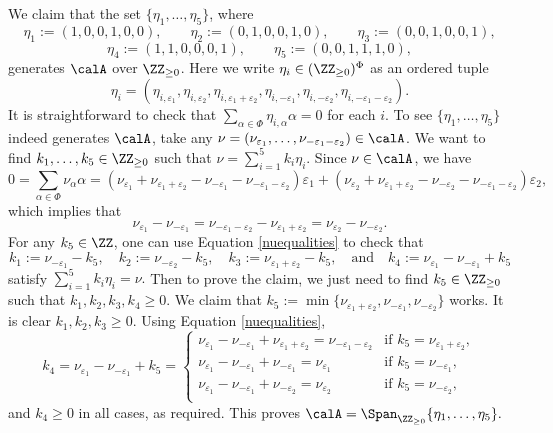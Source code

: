 \documentclass[12pt]{amsart}
\theoremstyle{plain}
\begin{document}
We claim that the set $\{\eta_1, \ldots, \eta_5\}$, where
$$\eta_1:=(1,0,0,1,0,0), \qquad \eta_2 := (0,1,0,0,1,0), \qquad \eta_3 := (0,0,1,0,0,1),$$
$$\eta_4 :=(1,1,0,0,0,1), \qquad \eta_5:=(0,0,1,1,1,0),$$
generates $\calA$ over $\ZZ_{\ge 0}$.
Here we write $\eta_i \in (\ZZ_{\ge 0})^\Phi$ as an ordered tuple 
$$\eta_i = (\eta_{i,\varepsilon_1}, \eta_{i,\varepsilon_2}, \eta_{i,\varepsilon_1+\varepsilon_2}, \eta_{i,-\varepsilon_1}, \eta_{i,-\varepsilon_2}, \eta_{i,-\varepsilon_1-\varepsilon_2}).$$
It is straightforward to check that $\sum_{\alpha\in\Phi} \eta_{i,\alpha}\alpha=0$ for each $i$.
To see $\{\eta_1, \ldots, \eta_5\}$ indeed generates $\calA$, take any $\nu = (\nu_{\varepsilon_1}, \ldots, \nu_{-\varepsilon_1-\varepsilon_2}) \in \calA$.
We want to find $k_1, \ldots, k_5 \in \ZZ_{\ge 0}$ such that $\nu = \sum_{i=1}^5 k_i \eta_i$.
Since $\nu \in \calA$, we have
$$0 = \sum_{\alpha \in \Phi} \nu_\alpha \alpha 
= (\nu_{\varepsilon_1}+\nu_{\varepsilon_1+\varepsilon_2}-\nu_{-\varepsilon_1}-\nu_{-\varepsilon_1-\varepsilon_2})\varepsilon_1 + (\nu_{\varepsilon_2} + \nu_{\varepsilon_1+\varepsilon_2}-\nu_{-\varepsilon_2}-\nu_{-\varepsilon_1-\varepsilon_2})\varepsilon_2,$$
which implies that
\begin{equation}\label{nuequalities}
	\nu_{\varepsilon_1} - \nu_{-\varepsilon_1} = \nu_{-\varepsilon_1-\varepsilon_2}-\nu_{\varepsilon_1+\varepsilon_2} = \nu_{\varepsilon_2} - \nu_{-\varepsilon_2}.
\end{equation}
For any $k_5 \in \ZZ$, one can use Equation \ref{nuequalities} to check that
$$k_1 :=\nu_{-\varepsilon_1}-k_5, \quad k_2 :=\nu_{-\varepsilon_2} - k_5, \quad k_3 := \nu_{\varepsilon_1+\varepsilon_2}-k_5, \quad \text{and} \quad k_4 := \nu_{\varepsilon_1} - \nu_{-\varepsilon_1} + k_5$$
satisfy $\sum_{i=1}^5 k_i \eta_i = \nu.$
Then to prove the claim, we just need to find $k_5 \in \ZZ_{\ge 0}$ such that $k_1, k_2, k_3, k_4 \ge 0.$
We claim that $k_5:=\min\{\nu_{\varepsilon_1+\varepsilon_2},\nu_{-\varepsilon_1},\nu_{-\varepsilon_2}\}$ works.
It is clear $k_1, k_2, k_3 \ge 0$.
Using Equation \ref{nuequalities},
$$k_4 = \nu_{\varepsilon_1}-\nu_{-\varepsilon_1}+k_5 =
\begin{cases}
	\nu_{\varepsilon_1} - \nu_{-\varepsilon_1} + \nu_{\varepsilon_1+\varepsilon_2} = \nu_{-\varepsilon_1-\varepsilon_2} & \text{if } k_5=\nu_{\varepsilon_1+\varepsilon_2}, \\
	\nu_{\varepsilon_1} - \nu_{-\varepsilon_1} + \nu_{-\varepsilon_1} = \nu_{\varepsilon_1} & \text{if } k_5=\nu_{-\varepsilon_1}, \\
	\nu_{\varepsilon_1} - \nu_{-\varepsilon_1} + \nu_{-\varepsilon_2} = \nu_{\varepsilon_2} & \text{if } k_5=\nu_{-\varepsilon_2}, \\
\end{cases}$$
and $k_4 \ge 0$ in all cases, as required.
This proves $\calA = \Span_{\ZZ_{\ge 0}} \{\eta_1, \ldots, \eta_5\}.$
\end{document}
